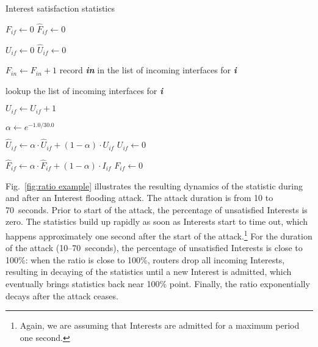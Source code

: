 \begin{algorithm}[h]
\footnotesize
\caption{\small Interest satisfaction statistics}
\label{algo:interest stats}
\begin{algorithmic}[1]

    \State $F_{if} \leftarrow 0$ 
    \State $\hat F_{if} \leftarrow 0$ 

    \State $U_{if} \leftarrow 0$ 
    \State $\hat U_{if} \leftarrow 0$ 
\EndFor

\vspace{0.1cm}
  \State $F_{in} \leftarrow F_{in} + 1$
  \State record \textbf{\emph{in}} in the list of incoming interfaces for \textbf{\emph{i}}
\EndFunction

\vspace{0.1cm}
    \State lookup the list of incoming interfaces for \textbf{\emph{i}}

        \State $U_{if} \leftarrow U_{if} + 1$
    \EndFor
\EndFunction

\vspace{0.1cm}

\State {} 
 
\State $\alpha \leftarrow e^{-1.0/30.0}$  %

    \State $\hat U_{if} \leftarrow \alpha \cdot \hat U_{if} + (1 - \alpha) \cdot U_{if}$ 
    \State $U_{if} \leftarrow 0$ 

     
        \State $\hat F_{if} \leftarrow \alpha \cdot \hat F_{if} + (1 - \alpha) \cdot I_{if}$ 
        \State $F_{if} \leftarrow 0$ 
    \EndIf
\EndFor

\EndFunction

\end{algorithmic}
\end{algorithm}


Fig.~\ref{fig:ratio example} illustrates the resulting dynamics of the statistic during and after an Interest flooding attack. The attack duration is from 10 to 70~seconds. Prior to start of the attack, the percentage of unsatisfied Interests is zero.  
The statistics build up rapidly as soon as Interests start to time out, which happens approximately one second after the start of the attack.\footnote{Again, we are assuming that Interests are admitted for a maximum period one second.}
For the duration of the attack (10--70~seconds), the percentage of unsatisfied Interests is close to 100\%: 
when the ratio is close to 100\%, routers drop all incoming Interests, resulting in decaying of the statistics until a new Interest is admitted, which eventually brings statistics back near 100\% point.
Finally, the ratio exponentially decays after the attack ceases.


